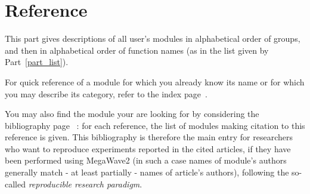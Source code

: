%
%


\part{Reference}
\label{part_reference}

This part gives descriptions of all user's modules in alphabetical order
of groups, and then in alphabetical order of function names (as in the
list given by Part~\ref{part_list}). 

For quick reference of a module for which you already know its name or for which 
you may describe its category, refer to the index page~\pageref{print_index}. 

You may also find the module your are looking for by considering the bibliography 
page~\pageref{bibliography} : for each reference, the list of modules making citation 
to this reference is given. This bibliography is therefore the main entry for researchers 
who want to reproduce experiments reported in the cited articles, if they have been
performed using MegaWave2 (in such a case names of module's authors generally match
- at least partially - names of article's authors), following the so-called {\em reproducible
research paradigm}.

\newpage

